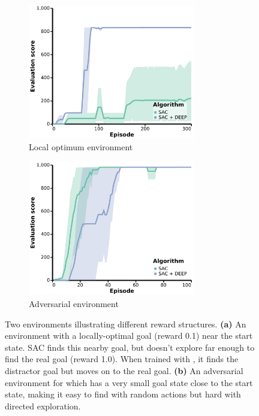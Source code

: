 \begin{figure}[h]
    \centering
    \begin{subfigure}[b]{0.49\textwidth}
        \centering
        \includegraphics[width=0.8\textwidth]{figures/deep/hallway_velocity_4_distractor.pdf}
        \caption{Local optimum environment} \label{fig:hallway_local_optimum}
    \end{subfigure}
    \hfill
    \begin{subfigure}[b]{0.49\textwidth}
        \centering
        \includegraphics[width=0.8\textwidth]{figures/deep/hallway_velocity_4_inverse_distractor.pdf}
        \caption{Adversarial environment}\label{fig:inverse_distractor}
    \end{subfigure}
    \caption{Two environments illustrating different reward structures.
    \textbf{(a)} An environment with a locally-optimal goal (reward 0.1) near the start state. SAC finds this nearby goal, but doesn't explore far enough to find the real goal (reward 1.0). When trained with \algshort{}, it finds the distractor goal but moves on to the real goal.
    \textbf{(b)} An adversarial environment for \algshort{} which has a very small goal state close to the start state, making it easy to find with random actions but hard with directed exploration.}
    \label{fig:hallway}
\end{figure}

